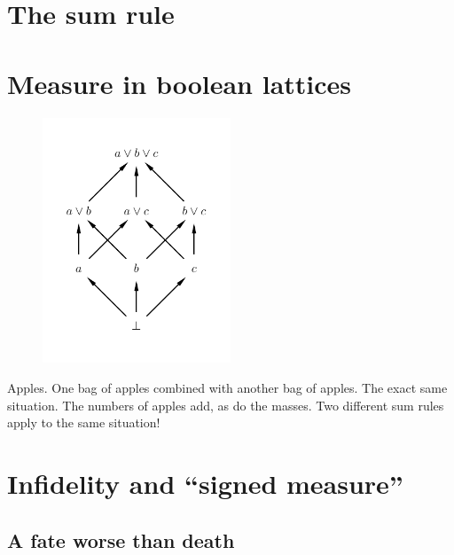 \documentclass[a4paper, 12pt]{article}
\begin{document}
\section{The sum rule}

\section{Measure in boolean lattices}


\begin{figure}[!ht]
\centering
\includegraphics[width=0.5\textwidth]{figures/boolean_lattice.pdf}
\caption{\label{fig:boolean_lattice}}
\end{figure}


Apples.
One bag of apples combined with another bag of apples.
The exact same situation. The numbers of apples add, as
do the masses. Two different sum rules apply to the same
situation!


\section{Infidelity and ``signed measure''}

\subsection{A fate worse than death}
\end{document}
